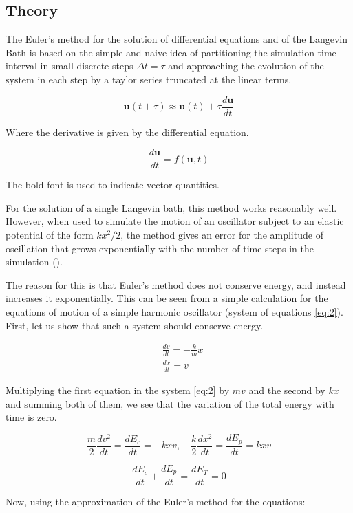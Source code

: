 \subsection{Theory}
The Euler's method for the solution of differential equations and of the Langevin Bath is based on the simple and naive idea of partitioning the simulation time interval in small discrete steps $\Delta t = \tau$ and approaching the evolution of the system in each step by a taylor series truncated at the linear terms.

$$\mathbf{u}(t+\tau) \approx \mathbf{u}(t) + \tau \frac{d\mathbf{u}}{dt}$$

Where the derivative is given by the differential equation.

$$\frac{d\mathbf{u}}{dt} = f(\mathbf{u},t)$$

The bold font is used to indicate vector quantities.

For the solution of a single Langevin bath, this method works reasonably well. However, when used to simulate the motion of an oscillator subject to an elastic potential of the form $k x^2/2$, the method gives an error for the amplitude of oscillation that grows exponentially with the number of time steps in the simulation ().

The reason for this is that Euler's method does not conserve energy, and instead increases it exponentially. This can be seen from a simple calculation for the equations of motion of a simple harmonic oscillator (system of equations \ref{eq:2}). First, let us show that such a system should conserve energy.

\begin{equation*} \label{eq:2}
\begin{aligned}
&\frac{dv}{dt} = -\frac{k}{m}x\\
&\frac{dx}{dt}=v
\end{aligned}
\end{equation*}

Multiplying the first equation in the system \ref{eq:2} by $m v$ and the second by $k x$ and summing both of them, we see that the variation of the total energy with time is zero.

$$\frac{m}{2}\frac{d v^2}{dt} = \frac{d E_c}{dt} = -k x v, \quad
\frac{k}{2}\frac{d x^2}{dt} = \frac{d E_p}{dt} = k x v$$

$$\frac{d E_c}{dt} + \frac{d E_p}{dt} = \frac{d E_T}{dt} = 0$$

Now, using the approximation of the Euler's method for the equations:

